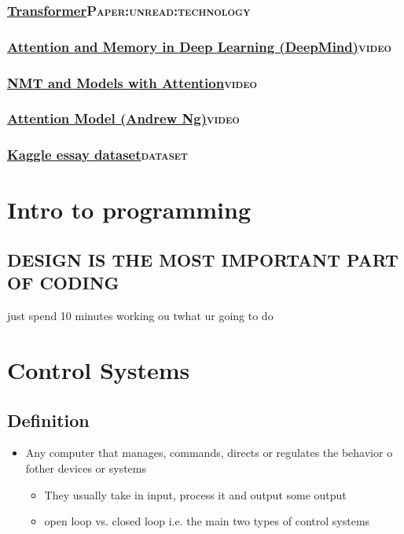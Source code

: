 \documentclass[11pt]{article}
\begin{document}
\subsubsection{\href{./cs/Transformer.pdf}{Transformer}\hfill{}\textsc{Paper:unread:technology}}
\label{sec:org6c84bf2}
\subsubsection{\href{https://www.youtube.com/watch?v=Q57rzaHHO0k}{Attention and Memory in Deep Learning (DeepMind)}\hfill{}\textsc{video}}
\label{sec:orgb2dab48}
\subsubsection{\href{https://www.youtube.com/watch?v=IxQtK2SjWWM}{NMT and Models with Attention}\hfill{}\textsc{video}}
\label{sec:org881efd8}
\subsubsection{\href{https://www.youtube.com/watch?v=quoGRI-1l0A\&t=130s}{Attention Model (Andrew Ng)}\hfill{}\textsc{video}}
\label{sec:org6b826c2}
\subsubsection{\href{https://raw.githubusercontent.com/shubhpawar/Automated-Essay-Scoring/master/essays\_and\_scores.csv}{Kaggle essay dataset}\hfill{}\textsc{dataset}}
\label{sec:orgaa6b28c}
\section{Intro to programming}
\label{sec:orgcaf3f97}
\subsection{DESIGN IS THE MOST IMPORTANT PART OF CODING}
\label{sec:orgf147e23}
just spend 10 minutes working ou twhat ur going to do
\section{Control Systems}
\label{sec:org1ea4ae1}
\subsection{Definition}
\label{sec:org592ee8e}
\begin{itemize}
\item Any computer that manages, commands, directs or regulates the behavior o fother devices or systems
\begin{itemize}
\item They usually take in input, process it and output some output
\item open loop vs. closed loop i.e. the main two types of control systems
\end{itemize}
\end{itemize}
\end{document}
